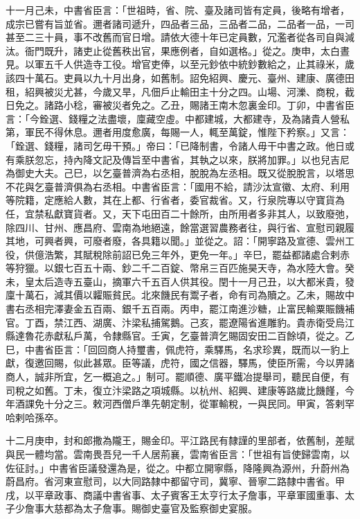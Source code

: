 \begin{pinyinscope}
 十一月己未，中書省臣言：「世祖時，省、院、臺及諸司皆有定員，後略有增者，成宗已嘗有旨並省。邇者諸司遞升，四品者三品，三品者二品，二品者一品，一司甚至二三十員，事不改舊而官日增。請依大德十年已定員數，冗濫者從各司自與減汰。衙門既升，諸吏止從舊秩出官，果應例者，自如選格。」從之。庚申，太白晝見。以軍五千人供造寺工役。增官吏俸，以至元鈔依中統鈔數給之，止其祿米，歲該四十萬石。吏員以九十月出身，如舊制。詔免紹興、慶元、臺州、建康、廣德田租，紹興被災尤甚，今歲又旱，凡佃戶止輸田主十分之四。山場、河濼、商稅，截日免之。諸路小稔，審被災者免之。乙丑，賜諸王南木忽裏金印。丁卯，中書省臣言：「今銓選、錢糧之法盡壞，廩藏空虛。中都建城，大都建寺，及為諸貴人營私第，軍民不得休息。邇者用度愈廣，每賜一人，輒至萬錠，惟陛下矜察。」又言：「銓選、錢糧，諸司乞毋干預。」帝曰：「已降制書，令諸人毋干中書之政。他日或有乘朕忽忘，持內降文記及傳旨至中書省，其執之以來，朕將加罪。」以也兒吉尼為御史大夫。己巳，以乞臺普濟為右丞相，脫脫為左丞相。既又從脫脫言，以塔思不花與乞臺普濟俱為右丞相。中書省臣言：「國用不給，請沙汰宣徽、太府、利用等院籍，定應給人數，其在上都、行省者，委官裁省。又，行泉院專以守寶貨為任，宜禁私獻寶貨者。又，天下屯田百二十餘所，由所用者多非其人，以致廢弛，除四川、甘州、應昌府、雲南為地絕遠，餘當選習農務者往，與行省、宣慰司親履其地，可興者興，可廢者廢，各具籍以聞。」並從之。詔：「開寧路及宣德、雲州工役，供億浩繁，其賦稅除前詔已免三年外，更免一年。」辛巳，罷益都諸處合剌赤等狩獵。以銀七百五十兩、鈔二千二百錠、幣帛三百匹施昊天寺，為水陸大會。癸未，皇太后造寺五臺山，摘軍六千五百人供其役。閏十一月己丑，以大都米貴，發廩十萬石，減其價以糶賑貧民。北來饑民有鬻子者，命有司為贖之。乙未，賜故中書右丞相完澤妻金五百兩、銀千五百兩。丙申，罷江南進沙糖，止富民輸粟賑饑補官。丁酉，禁江西、湖廣、汴梁私捕駕鵝。己亥，罷遼陽省進雕豹。貴赤衛受烏江縣達魯花赤獻私戶萬，令隸縣官。壬寅，乞臺普濟乞賜固安田二百餘頃，從之。乙巳，中書省臣言：「回回商人持璽書，佩虎符，乘驛馬，名求珍異，既而以一豹上獻，復邀回賜，似此甚眾。臣等議，虎符，國之信器，驛馬，使臣所需，今以畀諸商人，誠非所宜，乞一概追之。」制可。罷順德、廣平鐵冶提舉司，聽民自便，有司稅之如舊。丁未，復立汴梁路之項城縣。以杭州、紹興、建康等路歲比饑饉，今年酒課免十分之三。敕河西僧戶準先朝定制，從軍輸稅，一與民同。甲寅，答剌罕哈剌哈孫卒。



 十二月庚申，封和郎撒為隴王，賜金印。平江路民有隸謹的里部者，依舊制，差賦與民一體均當。雲南畏吾兒一千人居荊襄，雲南省臣言：「世祖有旨使歸雲南，以佐征討。」中書省臣議發還為是，從之。中都立開寧縣，降隆興為源州，升蔚州為蔚昌府。省河東宣慰司，以大同路隸中都留守司，冀寧、晉寧二路隸中書省。甲戌，以平章政事、商議中書省事、太子賓客王太亨行太子詹事，平章軍國重事、太子少詹事大慈都為太子詹事。賜御史臺官及監察御史宴服。



\end{pinyinscope}